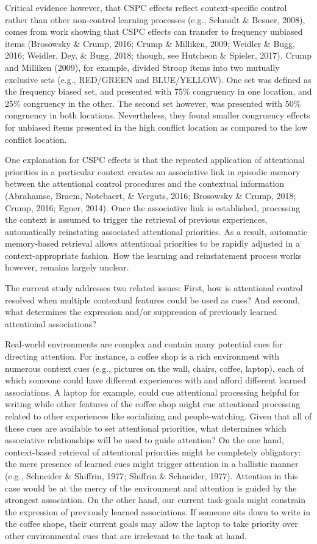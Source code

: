 \documentclass[english,,man,floatsintext]{apa6}
\begin{document}
Critical evidence however, that CSPC effects reflect context-specific control rather than other non-control learning processes (e.g., Schmidt \& Besner, 2008), comes from work showing that CSPC effects can transfer to frequency unbiased items (Brosowsky \& Crump, 2016; Crump \& Milliken, 2009; Weidler \& Bugg, 2016; Weidler, Dey, \& Bugg, 2018; though, see Hutcheon \& Spieler, 2017). Crump and Milliken (2009), for example, divided Stroop items into two mutually exclusive sets (e.g., RED/GREEN and BLUE/YELLOW). One set was defined as the frequency biased set, and presented with 75\% congruency in one location, and 25\% congruency in the other. The second set however, was presented with 50\% congruency in both locations. Nevertheless, they found smaller congruency effects for unbiased items presented in the high conflict location as compared to the low conflict location.

One explanation for CSPC effects is that the repeated application of attentional priorities in a particular context creates an associative link in episodic memory between the attentional control procedures and the contextual information (Abrahamse, Braem, Notebaert, \& Verguts, 2016; Brosowsky \& Crump, 2018; Crump, 2016; Egner, 2014). Once the associative link is established, processing the context is assumed to trigger the retrieval of previous experiences, automatically reinstating associated attentional priorities. As a result, automatic memory-based retrieval allows attentional priorities to be rapidly adjusted in a context-appropriate fashion. How the learning and reinstatement process works however, remains largely unclear.

The current study addresses two related issues: First, how is attentional control resolved when multiple contextual features could be used as cues? And second, what determines the expression and/or suppression of previously learned attentional associations?

Real-world environments are complex and contain many potential cues for directing attention. For instance, a coffee shop is a rich environment with numerous context cues (e.g., pictures on the wall, chairs, coffee, laptop), each of which someone could have different experiences with and afford different learned associations. A laptop for example, could cue attentional processing helpful for writing while other features of the coffee shop might cue attentional processing related to other experiences like socializing and people-watching. Given that all of these cues are available to set attentional priorities, what determines which associative relationships will be used to guide attention? On the one hand, context-based retrieval of attentional priorities might be completely obligatory: the mere presence of learned cues might trigger attention in a ballistic manner (e.g., Schneider \& Shiffrin, 1977; Shiffrin \& Schneider, 1977). Attention in this case would be at the mercy of the environment and attention is guided by the strongest association. On the other hand, our current task-goals might constrain the expression of previously learned associations. If someone sits down to write in the coffee shope, their current goals may allow the laptop to take priority over other environmental cues that are irrelevant to the task at hand.
\end{document}
